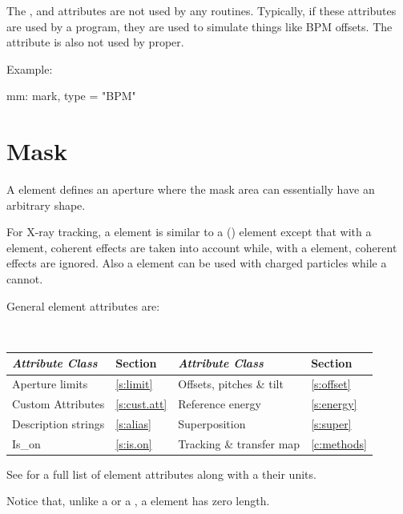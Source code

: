 {
The ,  and  attributes are not used
by any \bmad routines. Typically, if these attributes are used by a
program, they are used to simulate things like BPM offsets. The
 attribute is also not used by \bmad proper. 

Example:
\begin{example}
  mm: mark, type = "BPM"
\end{example}

\section{Mask}
\label{s:mask}

A  element defines an aperture where the mask area can
essentially have an arbitrary shape. 

For X-ray tracking, a  element is similar to a
 () element except that with
a  element, coherent effects are taken into
account while, with a  element, coherent effects are ignored.
Also a  element can be used with charged particles while a
 cannot.

General  element attributes are:
\begin{center}
\tt 
\begin{tabular}{llll} \toprule
  {\sl Attribute Class}      & Section           & {\sl Attribute Class}      & Section         \\ \midrule
  Aperture limits            & \ref{s:limit}     & Offsets, pitches \& tilt   & \ref{s:offset}  \\
  Custom Attributes          & \ref{s:cust.att}  & Reference energy           & \ref{s:energy}  \\
  Description strings        & \ref{s:alias}     & Superposition              & \ref{s:super}   \\
  Is_on                      & \ref{s:is.on}     & Tracking \& transfer map   & \ref{c:methods} \\
  \bottomrule
\end{tabular}
\end{center}
\toffset
See  for a full list of element attributes along with a their units.

Notice that, unlike a  or a , a  element has zero length.

}
